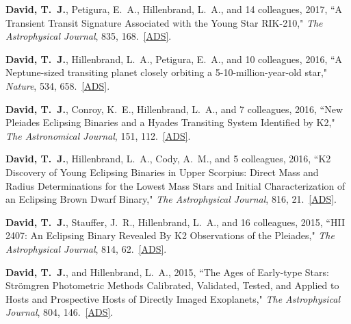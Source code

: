 \item {\bf {\bf David, T.}~J.}, {Petigura}, E.~A., {Hillenbrand}, L.~A., and 14 colleagues, 2017, ``{A Transient Transit Signature Associated with the Young Star RIK-210}," \textit{The Astrophysical Journal}, 835, 168.\ \href{https://ui.adsabs.harvard.edu/#abs/2017ApJ...835..168D/}{[ADS]}. 

\item {\bf {\bf David, T.}~J.}, {Hillenbrand}, L.~A., {Petigura}, E.~A., and 10 colleagues, 2016, ``{A Neptune-sized transiting planet closely orbiting a 5-10-million-year-old star}," \textit{Nature}, 534, 658.\ \href{https://ui.adsabs.harvard.edu/#abs/2016Natur.534..658D/}{[ADS]}. 

\item {\bf {\bf David, T.}~J.}, {Conroy}, K.~E., {Hillenbrand}, L.~A., and 7 colleagues, 2016, ``{New Pleiades Eclipsing Binaries and a Hyades Transiting System Identified by K2}," \textit{The Astronomical Journal}, 151, 112.\ \href{https://ui.adsabs.harvard.edu/#abs/2016AJ....151..112D/}{[ADS]}.

\item {\bf {\bf David, T.}~J.}, {Hillenbrand}, L.~A., {Cody}, A.~M., and 5 colleagues, 2016, ``{K2 Discovery of Young Eclipsing Binaries in Upper Scorpius: Direct Mass and Radius Determinations for the Lowest Mass Stars and Initial Characterization of an Eclipsing Brown Dwarf Binary}," \textit{The Astrophysical Journal}, 816, 21.\ \href{https://ui.adsabs.harvard.edu/#abs/2016ApJ...816...21D/}{[ADS]}.

\item {\bf {\bf David, T.}~J.}, {Stauffer}, J.~R., {Hillenbrand}, L.~A., and 16 colleagues, 2015, ``{HII 2407: An Eclipsing Binary Revealed By K2 Observations of the Pleiades}," \textit{The Astrophysical Journal}, 814, 62.\ \href{https://ui.adsabs.harvard.edu/#abs/2015ApJ...814...62D/}{[ADS]}.

\item {\bf {\bf David, T.}~J.}, and {Hillenbrand}, L.~A., 2015, ``{The Ages of Early-type Stars: Str{\"o}mgren Photometric Methods Calibrated, Validated, Tested, and Applied to Hosts and Prospective Hosts of Directly Imaged Exoplanets}," \textit{The Astrophysical Journal}, 804, 146.\ \href{https://ui.adsabs.harvard.edu/#abs/2015ApJ...804..146D/}{[ADS]}.




\iffalse 


